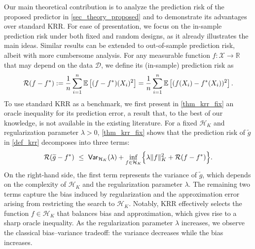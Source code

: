 \documentclass[11pt,twoside]{article}
\def\RR{\mathbb{R}}
\def\EE{\mathbb{E}}
\def\cH{\mathcal H}
\def\cD{\mathcal D}
\def\cR{\mathcal R}
\def\cX{\mathcal{X}}
\def\wt{\widetilde}
\def\l{\left}
\def\r{\right}
\begin{document}
Our main theoretical contribution is to analyze the prediction risk of the proposed predictor in \cref{sec_theory_proposed} and to demonstrate its advantages over standard KRR.  For ease of presentation, we focus on the in-sample prediction risk under both fixed and random designs, as it already illustrates the main ideas. Similar results can be extended to out-of-sample prediction risk, albeit with more cumbersome analysis. For any measurable function $f: \cX \to \RR$ that may depend on the data $\cD$, we define its (in-sample)  prediction risk as 
\begin{equation}\label{def_risk}
    \cR(f-f^*) :=    {1\over n} \sum_{i=1}^n \EE\l[(f-f^*)(X_i) ^2\r]  =   {1\over n} \sum_{i=1}^n \EE\l[(f(X_i)-f^*(X_i))^2\r].
\end{equation}
To use standard KRR as a benchmark, we first present in \cref{thm_krr_fix} an oracle inequality for its prediction error, a result that, to the best of our knowledge, is not available in the existing literature.
For a fixed $\cH_K$ and regularization parameter $\lambda>0$, \cref{thm_krr_fix} shows that the prediction risk of $\wt g$ in \eqref{def_krr} decomposes into three terms:
\begin{equation}\label{rate_KRR_intro}
   \cR(\wt g-f^*) ~  \le ~   \textsf{Var}_{\cH_K}(\lambda) + \inf_{f\in \cH_K}\Bigl\{\lambda \|f\|_K^2 + \cR(f-f^*)
    \Bigr\} .
\end{equation}
On the right-hand side, the first term represents the variance of $\wt g$, which depends on the complexity of $\cH_K$ and the regularization parameter $\lambda$. The remaining two terms capture the bias induced by regularization and the approximation error arising from restricting the search to $\cH_K$. Notably, KRR effectively selects the function $f \in \cH_K$ that balances bias and approximation, which gives rise to a sharp oracle inequality. As the regularization parameter $\lambda$ increases, we observe the classical bias–variance tradeoff: the variance decreases while the bias increases.
\end{document}
